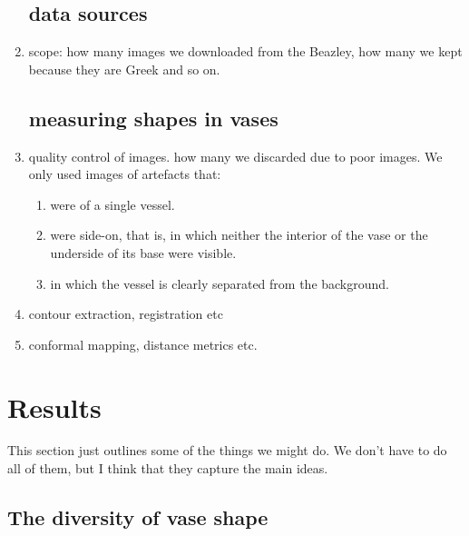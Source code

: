 \documentclass[onecolumn,10pt]{article}
\begin{document}
\begin{enumerate}
\subsection*{data sources}
\item scope:  how many images we downloaded from the Beazley, how many we kept because they are Greek and so on.
\subsection*{measuring shapes in vases}
\item quality control of images.  how many we discarded due to poor images. We only used images of artefacts that:
\begin{enumerate}
\item were of a single vessel.
\item were side-on, that is, in which neither the interior of the vase or the underside of its base were visible.   
\item in which the vessel is clearly separated from the background.
\end{enumerate}
\item contour extraction, registration etc
\item conformal mapping, distance metrics etc.
\end{enumerate}

\clearpage


\section*{Results}

This section just outlines some of the things we might do.  We don't have to do all of them, but I think that they capture the main ideas. 


\subsection*{The diversity of vase shape}
\end{document}
